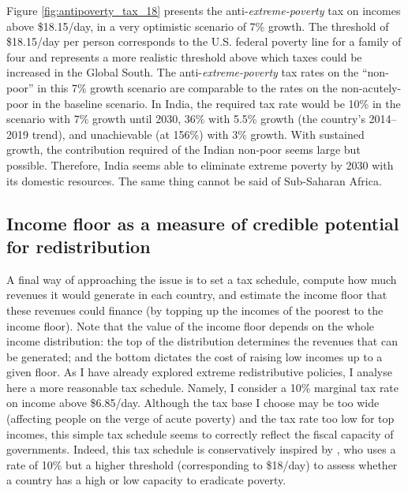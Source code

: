 Figure \ref{fig:antipoverty_tax_18} presents the anti-\textit{extreme-poverty} tax on incomes above \$18.15/day, in a very optimistic scenario of 7\% growth. The threshold of \$18.15/day per person corresponds to the U.S. federal poverty line for a family of four and represents a more realistic threshold above which taxes could be increased in the Global South. The anti-\textit{extreme-poverty} tax rates on the ``non-poor'' %
in this 7\% growth scenario are comparable to the rates on the non-acutely-poor in the baseline scenario. In India, the required tax rate would be 10\% %
in the scenario with 7\% growth until 2030, 36\% with 5.5\% growth (the country's 2014--2019 trend), and unachievable (at 156\%) with 3\% growth. %
With sustained growth, the contribution required of the Indian non-poor seems large but possible. %
Therefore, India seems able to eliminate extreme poverty by 2030 with its domestic resources. The same thing cannot be said of Sub-Saharan Africa. %


\subsection{Income floor as a measure of credible potential for redistribution}

A final way of approaching the issue is to set a tax schedule, compute how much revenues it would generate in each country, and estimate the income floor that these revenues could finance (by topping up the incomes of the poorest to the income floor). Note that the value of the income floor depends on the whole income distribution: the top of the distribution determines the revenues that can be generated; and the bottom dictates the cost of raising low incomes up to a given floor. As I have already explored extreme redistributive policies, I analyse here a more reasonable tax schedule. Namely, I consider a 10\% marginal tax rate on income above \$6.85/day. Although the tax base I choose may be too wide (affecting people on the verge of acute poverty) %
and the tax rate too low for top incomes, 
this simple tax schedule seems to correctly reflect the fiscal capacity of governments. Indeed, this tax schedule is conservatively inspired by \cite{ravallion_poorer_2010}, who uses a rate of 10\% but a higher threshold (corresponding to \$18/day) to assess whether a country has a high or low capacity to eradicate poverty. 

